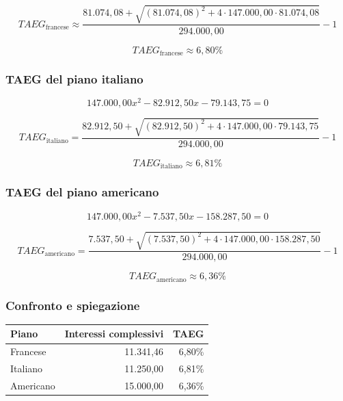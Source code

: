 \[
    TAEG_{\text{francese}}
    \approx
    \frac{
        81.074{,}08+
        \sqrt{
            (81.074{,}08)^2+
            4\cdot147.000{,}00\cdot81.074{,}08
        }
    }{294.000{,}00}
    -1
\]

\[
    \boxed{TAEG_{\text{francese}}\approx6{,}80\%}
\]

\subsubsection*{TAEG del piano italiano}

\[
    147.000{,}00x^2
    -82.912{,}50x
    -79.143{,}75
    =0
\]

\[
    TAEG_{\text{italiano}}
    =
    \frac{
        82.912{,}50+
        \sqrt{
            (82.912{,}50)^2+
            4\cdot147.000{,}00\cdot79.143{,}75
        }
    }{294.000{,}00}
    -1
\]

\[
    \boxed{TAEG_{\text{italiano}}\approx6{,}81\%}
\]

\subsubsection*{TAEG del piano americano}

\[
    147.000{,}00x^2
    -7.537{,}50x
    -158.287{,}50
    =0
\]

\[
    TAEG_{\text{americano}}
    =
    \frac{
        7.537{,}50+
        \sqrt{
            (7.537{,}50)^2+
            4\cdot147.000{,}00\cdot158.287{,}50
        }
    }{294.000{,}00}
    -1
\]

\[
    \boxed{TAEG_{\text{americano}}\approx6{,}36\%}
\]

\subsubsection*{Confronto e spiegazione}

\begin{center}
    \begin{tabular}{lrr}
        \hline
        Piano & Interessi complessivi & TAEG \\
        \hline
        Francese & 11.341,46 & 6,80\% \\
        Italiano & 11.250,00 & 6,81\% \\
        Americano & 15.000,00 & 6,36\% \\
        \hline
    \end{tabular}
\end{center}

